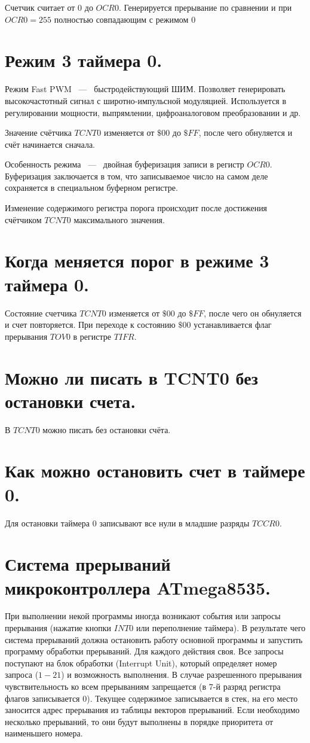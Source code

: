 Счетчик считает от $0$ до $OCR0$. Генерируется прерывание по сравнении и при $OCR0 = 255$ 
полностью совпадающим с режимом $0$

\section{Режим 3 таймера 0.}
Режим Fast PWM ~---~ быстродействующий ШИМ. Позволяет генерировать
высокочастотный сигнал с широтно-импульсной модуляцией. Используется 
в регулировании мощности, выпрямлении, цифроаналоговом преобразовании и др.

Значение счётчика $TCNT0$ изменяется от $\$00$ до $\$FF$, после чего 
обнуляется и счёт начинается сначала. 


Особенность режима ~---~ двойная буферизация записи в регистр $OCR0$.
Буферизация заключается в том, что записываемое число на самом деле сохраняется в
специальном буферном регистре.

Изменение содержимого регистра порога происходит после достижения 
счётчиком $TCNT0$ максимального значения. 

\section{Когда меняется порог в режиме 3 таймера 0.}
Состояние счетчика $TCNT0$ изменяется от $\$00$ до $\$FF$, после чего он обнуляется и счет 
повторяется. При переходе к состоянию $\$00$ устанавливается флаг прерывания $TOV0$ в 
регистре $TIFR$.

\section{Можно ли писать в TCNT0 без остановки счета.}
В $TCNT0$ можно писать без остановки счёта.

\section{Как можно остановить счет в таймере 0.}
Для остановки таймера $0$ записывают все нули в младшие разряды $TCCR0$.

\section{Система прерываний микроконтроллера ATmega8535.}

При выполнении некой программы иногда возникают события или запросы прерывания (нажатие кнопки
$INT0$ или переполнение таймера). В результате чего система прерываний должна остановить
работу основной программы и запустить программу обработки прерываний. Для каждого действия 
своя. Все запросы поступают на блок обработки (Interrupt Unit), который определяет номер 
запроса ($1-21$) и возможность выполнения. В случае разрешенного прерывания чувствительность
ко всем прерываниям запрещается (в $7$-й разряд регистра флагов записывается $0$). Текущее 
содержимое записывается в стек, на его место заносится адрес прерывания из таблицы векторов 
прерываний. Если необходимо несколько прерываний, то они будут выполнены в порядке приоритета 
от наименьшего номера.

